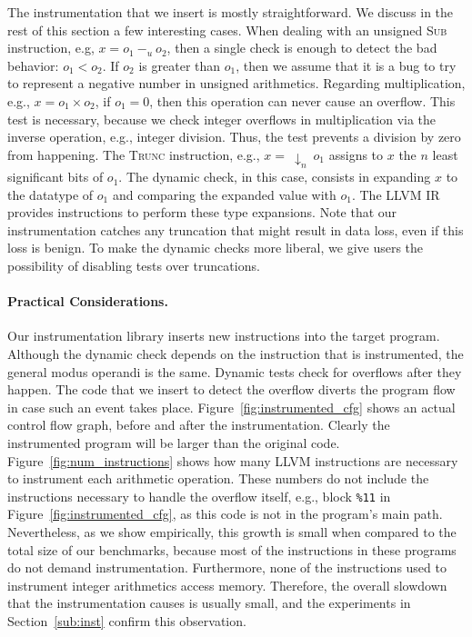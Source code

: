 \documentclass{sigplanconf}[10pt]
\begin{document}
The instrumentation that we insert is mostly straightforward.
We discuss in the rest of this section a few interesting cases.
When dealing with an unsigned \textsc{Sub} instruction, e.g,
$x = o_1 \ -_u \ o_2$, then a single check is enough to detect the bad
behavior: $o_1 < o_2$.
If $o_2$ is greater than $o_1$, then we assume that it is
a bug to try to represent a negative number in unsigned arithmetics.
Regarding multiplication, e.g., $x = o_1 \times o_2$, if $o_1 = 0$, then this
operation can never cause an overflow.
This test is necessary, because we check integer overflows in
multiplication via the inverse operation, e.g., integer division.
Thus, the test prevents a division by zero from happening.
The \textsc{Trunc} instruction, e.g., $x = \ \downarrow_n \ o_1$ assigns to $x$
the $n$ least significant bits of $o_1$.
The dynamic check, in this case, consists in expanding $x$ to
the datatype of $o_1$ and comparing the expanded value with $o_1$.
The LLVM IR provides instructions to perform these type expansions.
Note that our instrumentation catches any truncation that might result in
data loss, even if this loss is benign.
To make the dynamic checks more liberal, we give users the possibility of
disabling tests over truncations.

\paragraph{Practical Considerations. }
Our instrumentation library inserts new instructions into
the target program.
Although the dynamic check depends on the instruction that is instrumented,
the general modus operandi is the same.
Dynamic tests check for overflows after they happen.
The code that we insert to detect the overflow diverts the program flow in case
such an event takes place.
Figure~\ref{fig:instrumented_cfg} shows an actual control flow graph, before
and after the instrumentation.
Clearly the instrumented program will be larger than the original code.
Figure~\ref{fig:num_instructions} shows how many LLVM instructions are
necessary to instrument each arithmetic operation.
These numbers do not include the instructions necessary to handle the overflow
itself, e.g., block \texttt{\%11} in Figure~\ref{fig:instrumented_cfg}, as this
code is not in the program's main path.
Nevertheless, as we show empirically, this growth is small when
compared to the total size of our benchmarks, because most of the instructions
in these programs do not demand instrumentation.
Furthermore, none of the instructions used to instrument integer arithmetics
access memory.
Therefore, the overall slowdown that the instrumentation causes is usually
small, and the experiments in Section~\ref{sub:inst} confirm this
observation.
\end{document}

